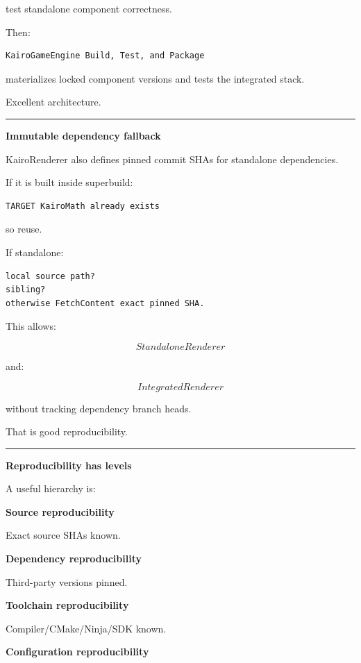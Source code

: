 test standalone component correctness.

Then:

\begin{verbatim}
KairoGameEngine Build, Test, and Package
\end{verbatim}

materializes locked component versions and tests the integrated stack.

Excellent architecture.

\begin{center}\rule{0.5\linewidth}{0.5pt}\end{center}

\textbf{Immutable dependency fallback}

KairoRenderer also defines pinned commit SHAs for standalone dependencies.

If it is built inside superbuild:

\begin{verbatim}
TARGET KairoMath already exists
\end{verbatim}

so reuse.

If standalone:

\begin{verbatim}
local source path?
sibling?
otherwise FetchContent exact pinned SHA.
\end{verbatim}

This allows:

\[
StandaloneRenderer
\]

and:

\[
IntegratedRenderer
\]

without tracking dependency branch heads.

That is good reproducibility.

\begin{center}\rule{0.5\linewidth}{0.5pt}\end{center}

\textbf{Reproducibility has levels}

A useful hierarchy is:

\textbf{Source reproducibility}

Exact source SHAs known.

\textbf{Dependency reproducibility}

Third-party versions pinned.

\textbf{Toolchain reproducibility}

Compiler/CMake/Ninja/SDK known.

\textbf{Configuration reproducibility}

